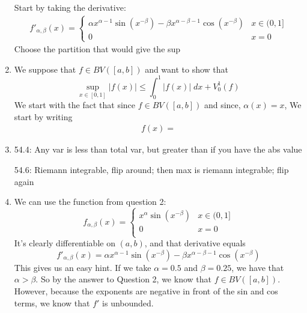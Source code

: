 \documentclass[12pt]{article}
\theoremstyle{plain}
\theoremstyle{definition}
\theoremstyle{remark}
\begin{document}
\begin{enumerate}
Start by taking the derivative:
\begin{align*}
    f'_{\alpha, \beta}(x) = 
        \begin{cases} 
            \alpha x^{\alpha-1}\sin(x^{-\beta}) -
            \beta x^{\alpha-\beta-1}\cos(x^{-\beta}) & 
            x\in(0,1] \\
            0 & x=0
        \end{cases}
\end{align*}
Choose the partition that would give the sup
        

\item We suppose that $f\in BV([a,b])$ and want to show that
    \[ \sup_{x\in[0,1]} |f(x)| \leq \int^1_0 |f(x)|\;dx
        + V^1_0(f) \]
We start with the fact that since $f\in BV([a,b])$ and since, $\alpha(x)=x$, We start by writing
\begin{align*}
    f(x) = 
\end{align*}

\item 54.4: Any var is less than total var, but greater than if you have the abs value

54.6: Riemann integrable, flip around; then max is riemann integrable; flip again

\item We can use the function from question 2:
    \[ 
        f_{\alpha, \beta}(x) = 
        \begin{cases}
            x^\alpha \sin(x^{-\beta}) & x\in (0, 1] \\
            0 & x=0 \\
        \end{cases}
    \]
It's clearly differentiable on $(a,b)$, and that derivative equals
\begin{equation}
        {f'}_{\alpha, \beta}(x) = \alpha x^{\alpha-1} 
            \sin(x^{-\beta}) - \beta x^{\alpha-\beta-1} \cos(x^{-\beta})
\end{equation}
This gives us an easy hint.  If we take $\alpha = 0.5$ and $\beta=0.25$, we have that $\alpha>\beta$.  So by the answer to Question 2, we know that $f\in BV([a,b])$. However, because the exponents are negative in front of the sin and cos terms, we know that $f'$ is unbounded. 
    


\end{enumerate}
\end{document}

